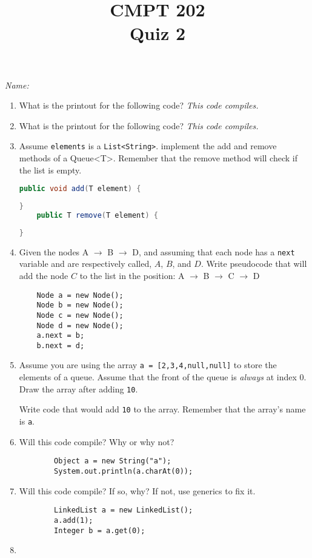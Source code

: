 \documentclass{article}
\title{CMPT 202\\Quiz 2}
\begin{document}
\maketitle
\emph{Name:}
\begin{enumerate}
	\item What is the printout for the following code? \emph{This
	code compiles.}
		
		\vspace{0.5in}
	\item What is the printout for the following code? \emph{This code
	compiles.}
		
		\vspace{0.5in}
	\item Assume \texttt{elements} is a \texttt{List<String>}. implement
	the add and remove methods of a Queue<T>. Remember that the remove
	method will check if the list is empty.
	\begin{lstlisting}[language = java]
	public void add(T element) {
	\end{lstlisting}
	\vspace{1in}
	\begin{lstlisting}[language = java]
	}
	public T remove(T element) {
	\end{lstlisting}
	\vspace{1in}
	\begin{lstlisting}[language = java]
	}
	\end{lstlisting}
	\item Given the nodes A $\rightarrow$ B $\rightarrow$ D, and assuming
	that each node has a \texttt{next} variable and are respectively
	called, $A$, $B$, and $D$. Write pseudocode that will add the node $C$
	to the list in the position: A $\rightarrow$ B $\rightarrow$ C
	$\rightarrow$ D
	\begin{lstlisting}
	Node a = new Node();
	Node b = new Node();
	Node c = new Node();
	Node d = new Node();
	a.next = b;
	b.next = d;
	\end{lstlisting}
	\vspace{1in}
	\newpage
	\item Assume you are using the array \texttt{a = [2,3,4,null,null]} to
	store the elements of a queue. Assume that the front of the queue is
	\emph{always} at index 0.
	Draw the array after adding \texttt{10}.
	\vspace{1in}

	Write code that would add \texttt{10} to the array. Remember that the
	array's name is \texttt{a}.
	\vspace{2in}
	\item Will this code compile? Why or why not?
	\begin{verbatim}
		Object a = new String("a");
		System.out.println(a.charAt(0));
	\end{verbatim}
	\vspace{1in}
	\item Will this code compile? If so, why?  If not, use generics to fix
	it.
	\begin{verbatim}
		LinkedList a = new LinkedList();
		a.add(1);
		Integer b = a.get(0);
	\end{verbatim}
\item 

\end{enumerate}
\end{document}
